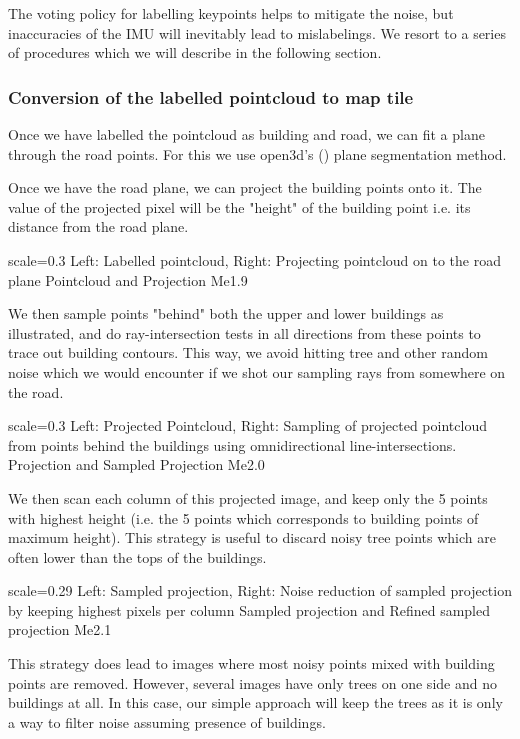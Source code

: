 The voting policy for labelling keypoints helps to mitigate the noise, but inaccuracies of the IMU will inevitably lead to mislabelings. We resort to a series of procedures which we will describe in the following section.

\subsubsection{Conversion of the labelled pointcloud to map tile}
Once we have labelled the pointcloud as building and road, we can fit a plane through the road points. For this we use open3d's (\cite{zhou2018}) plane segmentation method.

Once we have the road plane, we can project the building points onto it. The value of the projected pixel will be the "height" of the building point i.e. its distance from the road plane. 

{scale=0.3}%
{Left: Labelled pointcloud, Right: Projecting pointcloud on to the road plane}%
{Pointcloud and Projection}%
{Me1.9}

We then sample points "behind" both the upper and lower buildings as illustrated, and do ray-intersection tests in all directions from these points to trace out building contours. This way, we avoid hitting tree and other random noise which we would encounter if we shot our sampling rays from somewhere on the road. 

{scale=0.3}%
{Left: Projected Pointcloud, Right: Sampling of projected pointcloud from points behind the buildings using omnidirectional line-intersections.}%
{Projection and Sampled Projection}%
{Me2.0}

We then scan each column of this projected image, and keep only the 5 points with highest height (i.e. the 5 points which corresponds to building points of maximum height). This strategy is useful to discard noisy tree points which are often lower than the tops of the buildings. 

{scale=0.29}%
{Left: Sampled projection, Right: Noise reduction of sampled projection by keeping highest pixels per column}%
{Sampled projection and Refined sampled projection}%
{Me2.1}

This strategy does lead to images where most noisy points mixed with building points are removed. However, several images have only trees on one side and no buildings at all. In this case, our simple approach will keep the trees as it is only a way to filter noise assuming presence of buildings. 

